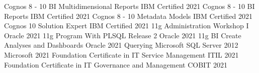 \begin{cvhonors}
  \cvhonor
    {Cognos 8 - 10 BI Multidimensional Reports} %
    {IBM Certified} %
    {} %
    {2021} %
  \cvhonor
    {Cognos 8 - 10 BI Reports} %
    {IBM Certified} %
    {} %
    {2021} %
  \cvhonor
    {Cognos 8 - 10 Metadata Models} %
    {IBM Certified} %
    {} %
    {2021} %
  \cvhonor
    {Cognos 10 Solution Expert} %
    {IBM Certified} %
    {} %
    {2021} %
  \cvhonor
    {11g Administration Workshop I} %
    {Oracle} %
    {} %
    {2021} %
  \cvhonor
    {11g Program With PLSQL Release 2} %
    {Oracle} %
    {} %
    {2021} %
  \cvhonor
    {11g BI Create Analyses and Dashboards} %
    {Oracle} %
    {} %
    {2021} %
  \cvhonor
    {Querying Microsoft SQL Server 2012} %
    {Microsoft} %
    {} %
    {2021} %
  \cvhonor
    {Foundation Certificate in IT Service Management} %
    {ITIL} %
    {} %
    {2021} %
  \cvhonor
    {Foundation Certificate in IT Governance and Management} %
    {COBIT} %
    {} %
    {2021} %
\end{cvhonors}
